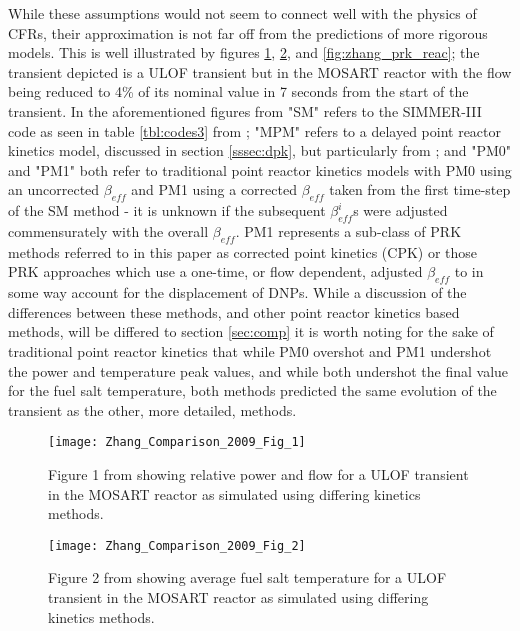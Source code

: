 \documentclass[review]{elsarticle}
\begin{document}
While these assumptions would not seem to connect well
with the physics of CFRs, their approximation is not far off from the
predictions of more rigorous models. This is well illustrated by figures
\ref{fig:zhang_prk_flow}, \ref{fig:zhang_prk_temp}, and 
\ref{fig:zhang_prk_reac};
the transient depicted is a ULOF transient but in the MOSART reactor with the
flow being reduced to 4\% of its nominal value in 7 seconds from the start
of the transient. In
the aforementioned figures from \cite{zhang_comparison_2009} "SM" refers
to the SIMMER-III code as seen in table \ref{tbl:codes3} from
\cite{rineiski_kinetics_2005}; "MPM" refers to a delayed point reactor kinetics
model, discussed in section \ref{sssec:dpk}, but particularly from
\cite{suzuki_reactivity-initiated-accident_2008}; and "PM0" and "PM1" both
refer to traditional point reactor kinetics models with PM0 using an
uncorrected $\beta_{eff}$ and PM1 using a corrected $\beta_{eff}$ taken from
the first time-step of the SM method - it is unknown if the subsequent
$\beta_{eff}^{i}$s were adjusted commensurately with the overall $\beta_{eff}$.
PM1 represents a sub-class of PRK methods referred to in this paper as
corrected point kinetics (CPK) or those PRK approaches which use a one-time, or
flow dependent, adjusted $\beta_{eff}$ to in some way account for the
displacement of DNPs.
While a discussion of the differences between these methods, and other point
reactor kinetics based methods, will be differed to section \ref{sec:comp}
it is worth noting for the sake of traditional point reactor kinetics that
while PM0 overshot and PM1 undershot the power and temperature peak values, and
while both undershot the final value for the fuel salt temperature, both methods
predicted the same evolution of the transient as the other, more detailed,
methods.

\begin{figure}[h]
   \centering
   \texttt{[image: Zhang\_Comparison\_2009\_Fig\_1]}
   \caption{Figure 1 from \cite{zhang_comparison_2009} showing relative power and flow for a 
   ULOF transient in the MOSART reactor as simulated using differing kinetics methods.} 
   \label{fig:zhang_prk_flow}
\end{figure}

\begin{figure}[h]
   \centering
   \texttt{[image: Zhang\_Comparison\_2009\_Fig\_2]}
   \caption{Figure 2 from \cite{zhang_comparison_2009} showing average fuel salt temperature for a
   ULOF transient in the MOSART reactor as simulated using differing kinetics methods.} 
   \label{fig:zhang_prk_temp}
\end{figure}
\end{document}

